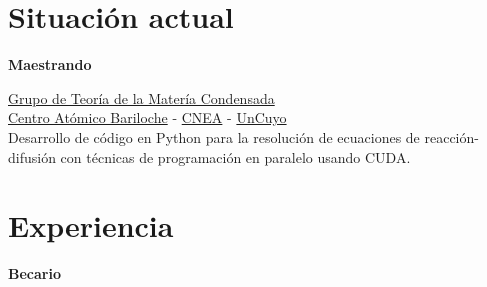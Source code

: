 \documentclass[a4paper,10pt]{article}
\begin{document}
%
\hfill
\begin{adjustbox}{valign=t}
\begin{minipage}{0.02\textwidth} %
\MyVerticalRule  %
\end{minipage}
\end{adjustbox}
\hfill
%
\begin{adjustbox}{valign=t}
\begin{minipage}{0.5\textwidth} %

\section*{Situación actual}
\begin{description}
\raggedright
\item[\normalfont \textcolor{ColorOne}{Ago. 2021 -- Dic. 2022.}] \textbf{Maestrando}\\ \medskip

\href{https://fisica.cab.cnea.gov.ar/solidos/}{\textcolor{ColorTwo}{Grupo de Teoría de la Matería Condensada}} \\ 
\href{https://fisica.cab.cnea.gov.ar/}{\textcolor{ColorTwo}{Centro Atómico Bariloche}} 
\textcolor{ColorTwo}{-} \href{https://www.argentina.gob.ar/cnea}{\textcolor{ColorTwo}{CNEA}} \textcolor{ColorTwo}{-}
\href{https://www.uncuyo.edu.ar/}{\textcolor{ColorTwo}{UnCuyo}}\\

Desarrollo de código en Python para la resolución de ecuaciones de reacción-difusión con técnicas de programación en paralelo usando CUDA.

\end{description}

\vspace*{-.6cm}
\section*{Experiencia}
\begin{description}
\raggedright
\item[\normalfont \textcolor{ColorOne}{May. 2021 -- Sep. 2021.}] \textbf{Becario}\\ \medskip


\end{description}
\end{minipage}
\end{adjustbox}
\end{document}
